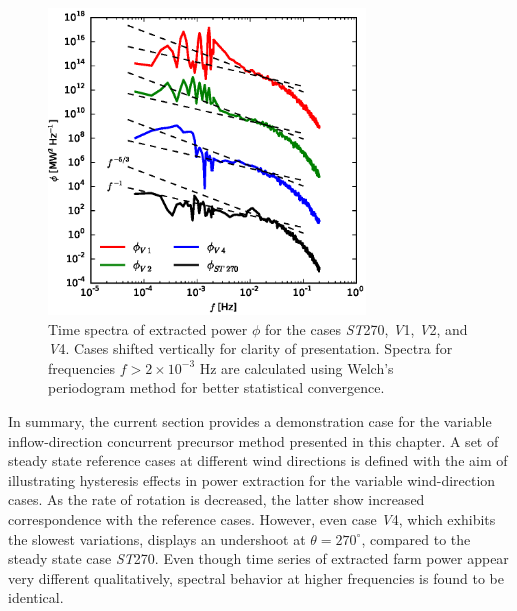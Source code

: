 		\begin{figure}[ht]
			\centering
			\includegraphics[width=0.75\textwidth]{chapters/turbulent_inflow/blm/figure14.eps}
			\caption[Time spectra of extracted power $\phi$ for the cases \emph{ST}270, \emph{V}1, \emph{V}2, and \emph{V}4. ]{Time spectra of extracted power $\phi$ for the cases \emph{ST}270, \emph{V}1, \emph{V}2, and \emph{V}4. Cases shifted vertically for clarity of presentation. Spectra for frequencies $f > 2 \times 10^{-3}$ Hz are calculated using Welch's periodogram method for better statistical convergence. }
			\label{fig:spectra_power}
		\end{figure}
		
		
		In summary, the current section provides a demonstration case for the variable inflow-direction concurrent precursor method presented in this chapter. A set of steady state reference cases at different wind directions is defined with the aim of illustrating hysteresis effects in power extraction for the variable wind-direction cases. As the rate of rotation is decreased, the latter show increased correspondence with the reference cases. However, even case \emph{V}4, which exhibits the slowest variations, displays an undershoot at $\theta = 270^\circ$, compared to the steady state case \emph{ST}270. Even though time series of extracted farm power appear very different qualitatively, spectral behavior at higher frequencies is found to be identical.
		
		
